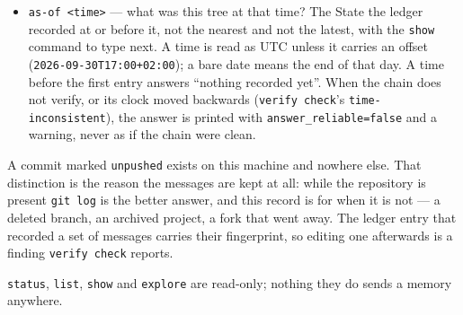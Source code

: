 \begin{itemize}
        what a colleague pulling this branch would see. \texttt{--timeline}
        reads the ledger straight through instead: one row per entry, in
        the order it happened, so \texttt{checkout}/\texttt{merge}/
        \texttt{push} appear beside \texttt{commit} rather than being
        dropped --- each row also prints the State it recorded, so a prefix
        to hand \texttt{show} is never more than a scroll away.
        \texttt{--branch NAME} asks for a different chapter of the
        memory. One not checked out here is read from Git, as a timeline
        of its entries: from its branch, its closed name, or the copy
        \texttt{ancestors} keeps once the branch is deleted, and the
        answer says which. One this clone holds nowhere names
        \texttt{memory clone --branch NAME} rather than answering for the
        wrong branch. \texttt{list} and \texttt{as-of} take the same
        option, and \texttt{show} looks in every chapter for a State that
        is not on disk; it also names the repositories whose commit, in
        that State, only \texttt{ancestors} still reaches.
  \item \texttt{as-of <time>} --- what was this tree at that time? The
        State the ledger recorded at or before it, not the nearest and not
        the latest, with the \texttt{show} command to type next. A time
        is read as UTC unless it carries an offset
        (\texttt{2026-09-30T17:00+02:00}); a bare date means the end of
        that day. A time before the first entry answers ``nothing recorded
        yet''. When the chain does not verify, or its clock moved backwards
        (\texttt{verify check}'s \texttt{time-inconsistent}), the answer is
        printed with \texttt{answer\_reliable=false} and a warning, never
        as if the chain were clean.
\end{itemize}

A commit marked \texttt{unpushed} exists on this machine and nowhere else.
That distinction is the reason the messages are kept at all: while the
repository is present \texttt{git log} is the better answer, and this record
is for when it is not --- a deleted branch, an archived project, a fork that
went away. The ledger entry that recorded a set of messages carries their
fingerprint, so editing one afterwards is a finding \texttt{verify check} reports.

\texttt{status}, \texttt{list}, \texttt{show} and \texttt{explore} are
read-only; nothing they do sends a memory anywhere.

